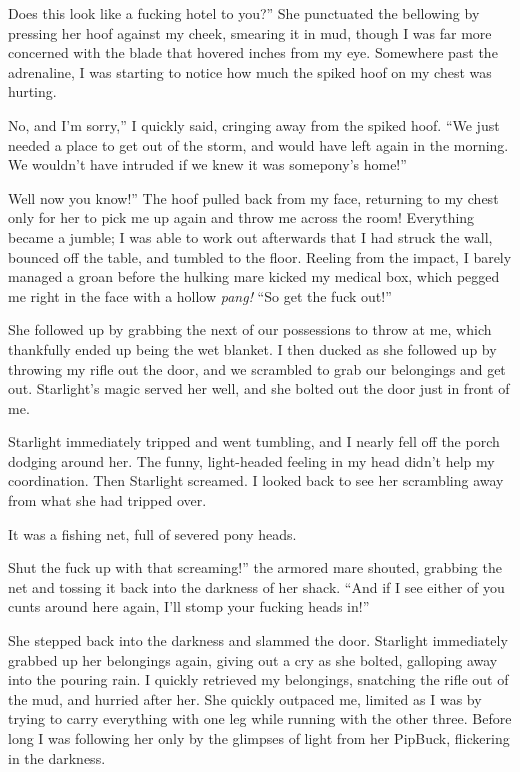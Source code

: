 \leavevmode{}Does this look like a fucking hotel to you?” She punctuated the bellowing by pressing her hoof against my cheek, smearing it in mud, though I was far more concerned with the blade that hovered inches from my eye. Somewhere past the adrenaline, I was starting to notice how much the spiked hoof on my chest was hurting.

\leavevmode{}No, and I’m sorry,” I quickly said, cringing away from the spiked hoof. “We just needed a place to get out of the storm, and would have left again in the morning. We wouldn’t have intruded if we knew it was somepony’s home!”

\leavevmode{}Well now you know!” The hoof pulled back from my face, returning to my chest only for her to pick me up again and throw me across the room! Everything became a jumble; I was able to work out afterwards that I had struck the wall, bounced off the table, and tumbled to the floor. Reeling from the impact, I barely managed a groan before the hulking mare kicked my medical box, which pegged me right in the face with a hollow \textit{pang!} “So get the fuck out!”

She followed up by grabbing the next of our possessions to throw at me, which thankfully ended up being the wet blanket. I then ducked as she followed up by throwing my rifle out the door, and we scrambled to grab our belongings and get out. Starlight’s magic served her well, and she bolted out the door just in front of me.

Starlight immediately tripped and went tumbling, and I nearly fell off the porch dodging around her. The funny, light-headed feeling in my head didn’t help my coordination. Then Starlight screamed. I looked back to see her scrambling away from what she had tripped over.

It was a fishing net, full of severed pony heads.

\leavevmode{}Shut the fuck up with that screaming!” the armored mare shouted, grabbing the net and tossing it back into the darkness of her shack. “And if I see either of you cunts around here again, I’ll stomp your fucking heads in!”

She stepped back into the darkness and slammed the door. Starlight immediately grabbed up her belongings again, giving out a cry as she bolted, galloping away into the pouring rain. I quickly retrieved my belongings, snatching the rifle out of the mud, and hurried after her. She quickly outpaced me, limited as I was by trying to carry everything with one leg while running with the other three. Before long I was following her only by the glimpses of light from her PipBuck, flickering in the darkness.

